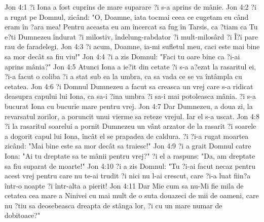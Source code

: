 Jon 4:1  ?i Iona a fost cuprins de mare suparare ?i s-a aprins de mânie.
Jon 4:2  ?i a rugat pe Domnul, zicând: "O, Doamne, iata tocmai ceea ce cugetam eu când eram în ?ara mea! Pentru aceasta eu am încercat sa fug în Tarsis, ca ?tiam ca Tu e?ti Dumnezeu îndurat ?i milostiv, îndelung-rabdator ?i mult-milosârd ?i Î?i pare rau de faradelegi.
Jon 4:3  ?i acum, Doamne, ia-mi sufletul meu, caci este mai bine sa mor decât sa fiu viu!"
Jon 4:4  ?i a zis Domnul: "Faci tu oare bine ca ?i-ai aprins mânia?"
Jon 4:5  Atunci Iona a ie?it din cetate ?i s-a a?ezat la rasaritul ei, ?i-a facut o coliba ?i a stat sub ea la umbra, ca sa vada ce se va întâmpla cu cetatea.
Jon 4:6  ?i Domnul Dumnezeu a facut sa creasca un vrej care s-a ridicat deasupra capului lui Iona, ca sa-i ?ina umbra ?i sa-i mai potoleasca mânia. ?i s-a bucurat Iona cu bucurie mare pentru vrej.
Jon 4:7  Dar Dumnezeu, a doua zi, la revarsatul zorilor, a poruncit unui vierme sa reteze vrejul. Iar el s-a uscat.
Jon 4:8  ?i la rasaritul soarelui a pornit Dumnezeu un vânt arzator de la rasarit ?i soarele a dogorit capul lui Iona, încât el se prapadea de caldura. ?i ?i-a rugat moartea zicând: "Mai bine este sa mor decât sa traiesc!"
Jon 4:9  ?i a grait Domnul catre Iona: "Ai tu dreptate sa te mânii pentru vrej?" ?i el a raspuns: "Da, am dreptate sa fiu suparat de moarte!"
Jon 4:10  ?i a zis Domnul: "Tu ?i-ai facut necaz pentru acest vrej pentru care nu te-ai trudit ?i nici nu l-ai crescut, care ?i-a luat fiin?a într-o noapte ?i într-alta a pierit!
Jon 4:11  Dar Mie cum sa nu-Mi fie mila de cetatea cea mare a Ninivei cu mai mult de o suta douazeci de mii de oameni, care nu ?tiu sa deosebeasca dreapta de stânga lor, ?i cu un mare numar de dobitoace?"



